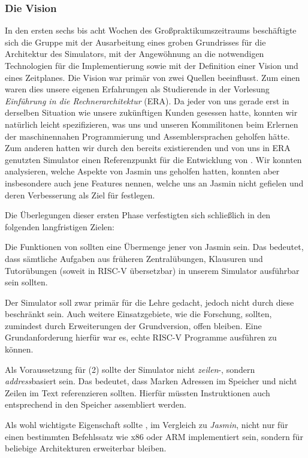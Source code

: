 
\subsubsection{Die Vision}
\label{team:orga-plan-vision}

In den ersten sechs bis acht Wochen des Großpraktikumszeitraums beschäftigte
sich die Gruppe mit der Ausarbeitung eines groben Grundrisses für die
Architektur des Simulators, mit der Angewöhnung an die notwendigen Technologien
für die Implementierung sowie mit der Definition einer Vision und eines
Zeitplanes. Die Vision war primär von zwei Quellen beeinflusst. Zum einen waren
dies unsere eigenen Erfahrungen als Studierende in der Vorlesung
\emph{Einführung in die Rechnerarchitektur} (ERA). Da jeder von uns gerade erst
in derselben Situation wie unsere zukünftigen Kunden gesessen hatte, konnten wir
natürlich leicht spezifizieren, was uns und unseren Kommilitonen beim Erlernen
der maschinennahen Programmierung und Assemblersprachen geholfen hätte. Zum
anderen hatten wir durch den bereits existierenden und von uns in ERA genutzten
Simulator einen Referenzpunkt für die Entwicklung von \erasim{}. Wir konnten
analysieren, welche Aspekte von Jasmin uns geholfen hatten, konnten aber
insbesondere auch jene Features nennen, welche uns an Jasmin nicht gefielen und
deren Verbesserung als Ziel für \erasim{} festlegen.

Die Überlegungen dieser ersten Phase verfestigten sich schließlich in den
folgenden langfristigen Zielen:
\begin{senumerate}{-0.45cm}
  \item Die Funktionen von \erasim{} sollten eine Übermenge jener von Jasmin
  sein. Das bedeutet, dass sämtliche Aufgaben aus früheren Zentralübungen,
  Klausuren und Tutorübungen (soweit in RISC-V übersetzbar) in unserem Simulator ausführbar sein sollten.
  \item Der Simulator soll zwar primär für die Lehre gedacht, jedoch nicht durch
  diese beschränkt sein. Auch weitere Einsatzgebiete, wie die Forschung,
  sollten, zumindest durch Erweiterungen der Grundversion, offen bleiben. Eine
  Grundanforderung hierfür war es, echte RISC-V Programme ausführen zu können.
  \item Als Voraussetzung für (2) sollte der Simulator nicht \emph{zeilen}-,
  sondern \emph{address}basiert sein. Das bedeutet, dass Marken Adressen im
  Speicher und nicht Zeilen im Text referenzieren sollten. Hierfür müssten
  Instruktionen auch entsprechend in den Speicher assembliert werden.
  \item Als wohl wichtigste Eigenschaft sollte \erasim{}, im Vergleich zu
  \emph{Jasmin}, nicht nur für einen bestimmten Befehlssatz wie x86 oder ARM
  implementiert sein, sondern für beliebige Architekturen erweiterbar bleiben.
  \vspace{-0.4cm}
\end{senumerate}
